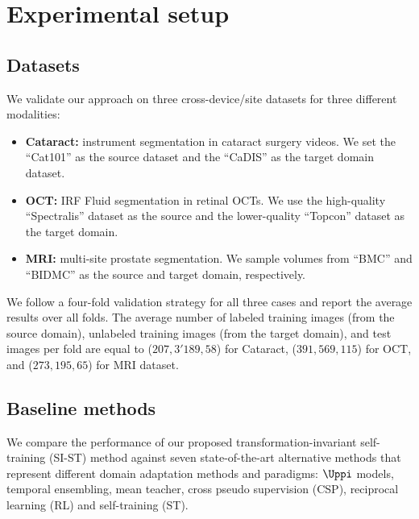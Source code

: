 \section{Experimental setup}
\label{sec:tist_experimental_settings}

\subsection{Datasets}
We validate our approach on three cross-device/site datasets for three different modalities: 

\begin{itemize}
    \item \textbf{Cataract:} instrument segmentation in cataract surgery videos. We set the ``Cat101'' as the source dataset and the ``CaDIS'' as the target domain dataset. 
    \item \textbf{OCT:} IRF Fluid segmentation in retinal OCTs. We use the high-quality ``Spectralis'' dataset as the source and the lower-quality ``Topcon'' dataset as the target domain.
    \item \textbf{MRI:} multi-site prostate segmentation. We sample volumes from ``BMC'' and ``BIDMC'' as the source and target domain, respectively.
\end{itemize} 

We follow a four-fold validation strategy for all three cases and report the average results over all folds. The average number of labeled training images (from the source domain), unlabeled training images (from the target domain), and test images per fold are equal to ($207, 3'189,58$) for Cataract, ($391,569,115$) for OCT, and ($273,195,65$) for MRI dataset.

\subsection{Baseline methods}
We compare the performance of our proposed transformation-invariant self-training (SI-ST) method against seven state-of-the-art alternative methods that represent different domain adaptation methods and paradigms: $\Uppi$ models, temporal ensembling, mean teacher, cross pseudo supervision (CSP), reciprocal learning (RL) and self-training (ST).


